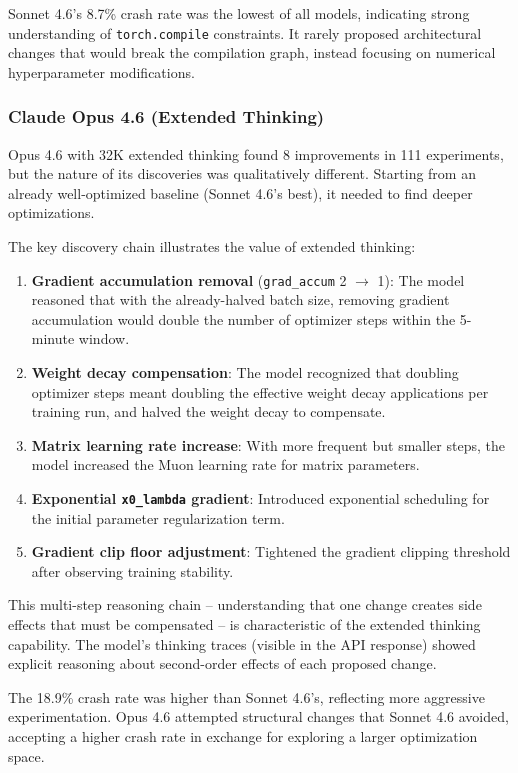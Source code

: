 \documentclass[11pt]{article}
\begin{document}
Sonnet 4.6's 8.7\% crash rate was the lowest of all models, indicating strong understanding of \texttt{torch.compile} constraints. It rarely proposed architectural changes that would break the compilation graph, instead focusing on numerical hyperparameter modifications.

\subsubsection{Claude Opus 4.6 (Extended Thinking)}

Opus 4.6 with 32K extended thinking found 8 improvements in 111 experiments, but the nature of its discoveries was qualitatively different. Starting from an already well-optimized baseline (Sonnet 4.6's best), it needed to find deeper optimizations.

The key discovery chain illustrates the value of extended thinking:

\begin{enumerate}[leftmargin=*]
    \item \textbf{Gradient accumulation removal} (\texttt{grad\_accum} 2 $\to$ 1): The model reasoned that with the already-halved batch size, removing gradient accumulation would double the number of optimizer steps within the 5-minute window.
    \item \textbf{Weight decay compensation}: The model recognized that doubling optimizer steps meant doubling the effective weight decay applications per training run, and halved the weight decay to compensate.
    \item \textbf{Matrix learning rate increase}: With more frequent but smaller steps, the model increased the Muon learning rate for matrix parameters.
    \item \textbf{Exponential \texttt{x0\_lambda} gradient}: Introduced exponential scheduling for the initial parameter regularization term.
    \item \textbf{Gradient clip floor adjustment}: Tightened the gradient clipping threshold after observing training stability.
\end{enumerate}

This multi-step reasoning chain -- understanding that one change creates side effects that must be compensated -- is characteristic of the extended thinking capability. The model's thinking traces (visible in the API response) showed explicit reasoning about second-order effects of each proposed change.

The 18.9\% crash rate was higher than Sonnet 4.6's, reflecting more aggressive experimentation. Opus 4.6 attempted structural changes that Sonnet 4.6 avoided, accepting a higher crash rate in exchange for exploring a larger optimization space.
\end{document}
